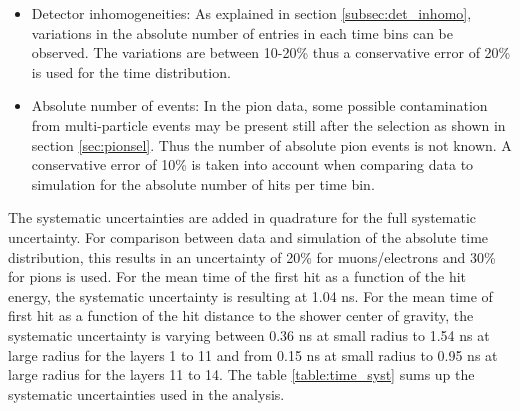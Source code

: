 \begin{itemize}
	\item Detector inhomogeneities: As explained in section \ref{subsec:det_inhomo}, variations in the absolute number of entries in each time bins can be observed. The variations are between 10-20\% thus a conservative error of 20\% is used for the time distribution.
	\item Absolute number of events: In the pion data, some possible contamination from multi-particle events may be present still after the selection as shown in section \ref{sec:pionsel}. Thus the number of absolute pion events is not known. A conservative error of 10\% is taken into account when comparing data to simulation for the absolute number of hits per time bin.
\end{itemize}

The systematic uncertainties are added in quadrature for the full systematic uncertainty. For comparison between data and simulation of the absolute time distribution, this results in an uncertainty of 20\% for muons/electrons and 30\% for pions is used. For the mean time of the first hit as a function of the hit energy, the systematic uncertainty is resulting at 1.04 ns. For the mean time of first hit as a function of the hit distance to the shower center of gravity, the systematic uncertainty is varying between 0.36 ns at small radius to 1.54 ns at large radius for the layers 1 to 11 and from 0.15 ns at small radius to 0.95 ns at large radius for the layers 11 to 14. The table \ref{table:time_syst} sums up the systematic uncertainties used in the analysis.
